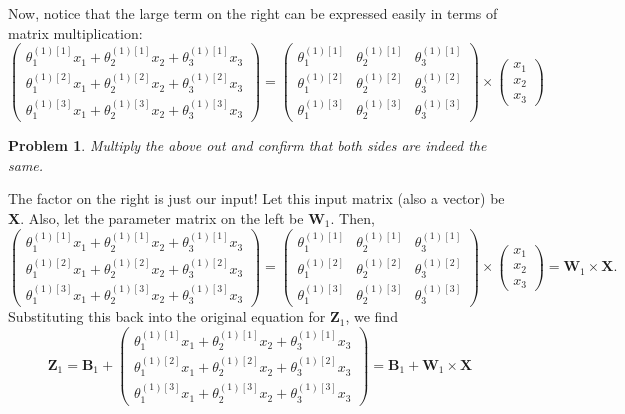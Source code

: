 \documentclass{article}
\newtheorem*{problem}{Problem}
\begin{document}
Now, notice that the large term on the right can be expressed easily in terms of matrix multiplication: 
\[\begin{pmatrix}
\theta_1^{(1)[1]}x_1+\theta_2^{(1)[1]}x_2+\theta_3^{(1)[1]}x_3\\
\theta_1^{(1)[2]}x_1+\theta_2^{(1)[2]}x_2+\theta_3^{(1)[2]}x_3\\
\theta_1^{(1)[3]}x_1+\theta_2^{(1)[3]}x_2+\theta_3^{(1)[3]}x_3
\end{pmatrix}=\begin{pmatrix}
\theta_1^{(1)[1]} & \theta_2^{(1)[1]} & \theta_3^{(1)[1]}\\
\theta_1^{(1)[2]} & \theta_2^{(1)[2]} & \theta_3^{(1)[2]}\\
\theta_1^{(1)[3]} & \theta_2^{(1)[3]} & \theta_3^{(1)[3]}
\end{pmatrix}\times
\begin{pmatrix}
x_1\\
x_2\\
x_3
\end{pmatrix}\]
\begin{problem}
Multiply the above out and confirm that both sides are indeed the same. 
\end{problem}
The factor on the right is just our input! Let this input matrix (also a vector) be \textbf{X}. Also, let the parameter matrix on the left be $\textbf{W}_1$. Then, 
\[\begin{pmatrix}
\theta_1^{(1)[1]}x_1+\theta_2^{(1)[1]}x_2+\theta_3^{(1)[1]}x_3\\
\theta_1^{(1)[2]}x_1+\theta_2^{(1)[2]}x_2+\theta_3^{(1)[2]}x_3\\
\theta_1^{(1)[3]}x_1+\theta_2^{(1)[3]}x_2+\theta_3^{(1)[3]}x_3
\end{pmatrix}=\begin{pmatrix}
\theta_1^{(1)[1]} & \theta_2^{(1)[1]} & \theta_3^{(1)[1]}\\
\theta_1^{(1)[2]} & \theta_2^{(1)[2]} & \theta_3^{(1)[2]}\\
\theta_1^{(1)[3]} & \theta_2^{(1)[3]} & \theta_3^{(1)[3]}
\end{pmatrix}\times
\begin{pmatrix}
x_1\\
x_2\\
x_3
\end{pmatrix}=\textbf{W}_1\times\textbf{X}.\]
Substituting this back into the original equation for $\textbf{Z}_1$, we find 
\[\textbf{Z}_1=\textbf{B}_1+
\begin{pmatrix}
\theta_1^{(1)[1]}x_1+\theta_2^{(1)[1]}x_2+\theta_3^{(1)[1]}x_3\\
\theta_1^{(1)[2]}x_1+\theta_2^{(1)[2]}x_2+\theta_3^{(1)[2]}x_3\\
\theta_1^{(1)[3]}x_1+\theta_2^{(1)[3]}x_2+\theta_3^{(1)[3]}x_3
\end{pmatrix}=\textbf{B}_1+\textbf{W}_1\times \textbf{X}\]
\end{document}
